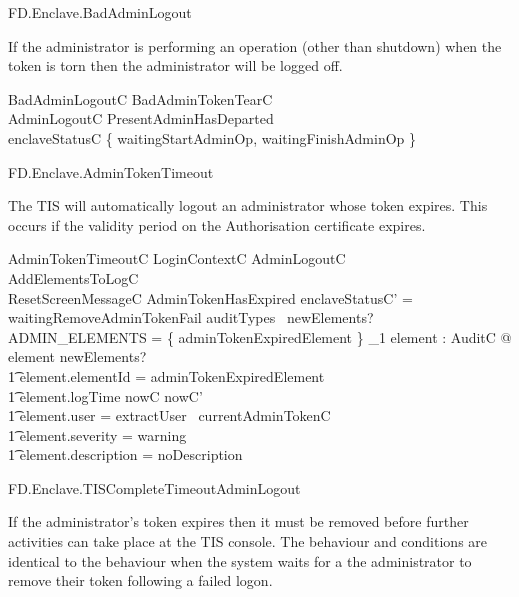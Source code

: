 \begin{traceunit}{FD.Enclave.BadAdminLogout}
\end{traceunit}

If the administrator is performing an operation (other than shutdown) when the token is torn
then the administrator will be logged off.

\begin{schema}{BadAdminLogoutC}
        BadAdminTokenTearC
\\      AdminLogoutC
\where
        PresentAdminHasDeparted
\\      enclaveStatusC \in \{ waitingStartAdminOp, waitingFinishAdminOp
        \}
\end{schema}

\begin{traceunit}{FD.Enclave.AdminTokenTimeout}
\end{traceunit}


The TIS will automatically logout an administrator whose token
expires. This occurs if the validity period on the Authorisation
certificate expires.

\begin{schema}{AdminTokenTimeoutC}
        LoginContextC
\also
        AdminLogoutC
\\      AddElementsToLogC
\\      ResetScreenMessageC
\where
        AdminTokenHasExpired
\also
        enclaveStatusC' = waitingRemoveAdminTokenFail
\also
        auditTypes~ newElements? \cap ADMIN\_ELEMENTS = 
        \{ adminTokenExpiredElement \} 
\also
        \exists_1 element : AuditC @ element \in newElements? 
\\ \t1  \land element.elementId = adminTokenExpiredElement
\\ \t1  \land element.logTime \in nowC \upto nowC'
\\ \t1  \land element.user = extractUser~ currentAdminTokenC
\\ \t1  \land element.severity = warning
\\ \t1  \land element.description = noDescription
\end{schema}

\begin{traceunit}{FD.Enclave.TISCompleteTimeoutAdminLogout}
\end{traceunit}

If the administrator's token expires then it must be removed before
further activities can take place at the TIS console. The behaviour
and conditions are identical to the behaviour when the system waits for a the
administrator to remove their token following a failed logon.

